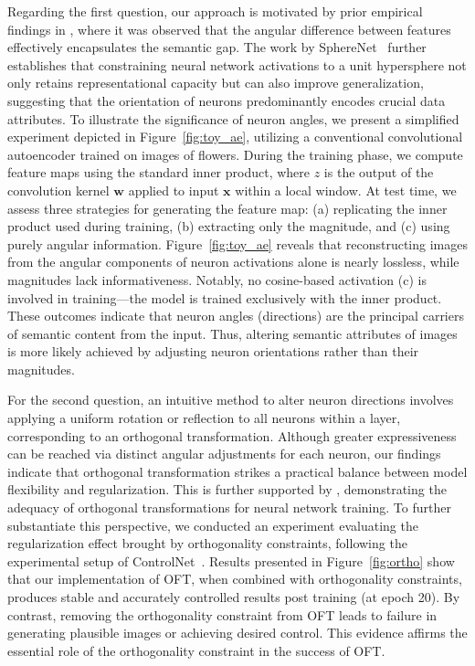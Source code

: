 Regarding the first question, our approach is motivated by prior empirical findings in \cite{liu2018decoupled,chen2020angular}, where it was observed that the angular difference between features effectively encapsulates the semantic gap. The work by SphereNet~\cite{liu2017deep} further establishes that constraining neural network activations to a unit hypersphere not only retains representational capacity but can also improve generalization, suggesting that the orientation of neurons predominantly encodes crucial data attributes. To illustrate the significance of neuron angles, we present a simplified experiment depicted in Figure~\ref{fig:toy_ae}, utilizing a conventional convolutional autoencoder trained on images of flowers. During the training phase, we compute feature maps using the standard inner product, where $z$ is the output of the convolution kernel $\bm{w}$ applied to input $\bm{x}$ within a local window. At test time, we assess three strategies for generating the feature map: (a) replicating the inner product used during training, (b) extracting only the magnitude, and (c) using purely angular information. Figure~\ref{fig:toy_ae} reveals that reconstructing images from the angular components of neuron activations alone is nearly lossless, while magnitudes lack informativeness. Notably, no cosine-based activation (c) is involved in training—the model is trained exclusively with the inner product. These outcomes indicate that neuron angles (directions) are the principal carriers of semantic content from the input. Thus, altering semantic attributes of images is more likely achieved by adjusting neuron orientations rather than their magnitudes.

For the second question, an intuitive method to alter neuron directions involves applying a uniform rotation or reflection to all neurons within a layer, corresponding to an orthogonal transformation. Although greater expressiveness can be reached via distinct angular adjustments for each neuron, our findings indicate that orthogonal transformation strikes a practical balance between model flexibility and regularization. This is further supported by \cite{liu2021orthogonal}, demonstrating the adequacy of orthogonal transformations for neural network training. To further substantiate this perspective, we conducted an experiment evaluating the regularization effect brought by orthogonality constraints, following the experimental setup of ControlNet~\cite{zhang2023adding}. Results presented in Figure~\ref{fig:ortho} show that our implementation of OFT, when combined with orthogonality constraints, produces stable and accurately controlled results post training (at epoch 20). By contrast, removing the orthogonality constraint from OFT leads to failure in generating plausible images or achieving desired control. This evidence affirms the essential role of the orthogonality constraint in the success of OFT.

